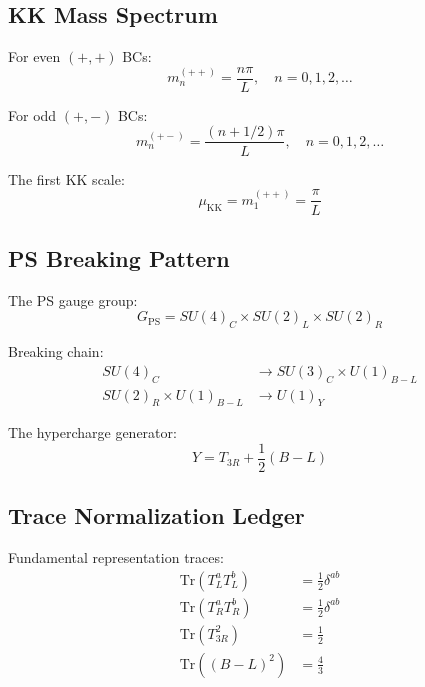 \documentclass[11pt,a4paper]{article}
\begin{document}
\subsection{KK Mass Spectrum}
\label{app:kk-mass}

For even $(+,+)$ BCs:
\begin{equation}
\label{eq:kk-even}
m_n^{(++)} = \frac{n\pi}{L}, \quad n = 0, 1, 2, \ldots
\end{equation}

For odd $(+,-)$ BCs:
\begin{equation}
\label{eq:kk-odd}
m_n^{(+-)} = \frac{(n + 1/2)\pi}{L}, \quad n = 0, 1, 2, \ldots
\end{equation}

The first KK scale:
\begin{equation}
\label{eq:mu-kk-first}
\mu_{\text{KK}} = m_1^{(++)} = \frac{\pi}{L}
\end{equation}

\subsection{PS Breaking Pattern}
\label{app:ps-breaking}

The PS gauge group:
\begin{equation}
\label{eq:ps-group-app}
G_{\text{PS}} = SU(4)_C \times SU(2)_L \times SU(2)_R
\end{equation}

Breaking chain:
\begin{align}
\label{eq:breaking-chain}
SU(4)_C &\to SU(3)_C \times U(1)_{B-L} \\
\label{eq:lr-breaking}
SU(2)_R \times U(1)_{B-L} &\to U(1)_Y
\end{align}

The hypercharge generator:
\begin{equation}
\label{eq:Y-generator}
Y = T_{3R} + \frac{1}{2}(B-L)
\end{equation}

\subsection{Trace Normalization Ledger}
\label{app:trace-ledger}

Fundamental representation traces:
\begin{align}
\label{eq:tr-TL}
\text{Tr}(T_L^a T_L^b) &= \frac{1}{2}\delta^{ab} \\
\label{eq:tr-TR}
\text{Tr}(T_R^a T_R^b) &= \frac{1}{2}\delta^{ab} \\
\label{eq:tr-T3R}
\text{Tr}(T_{3R}^2) &= \frac{1}{2} \\
\label{eq:tr-BL}
\text{Tr}((B-L)^2) &= \frac{4}{3}
\end{align}
\end{document}

